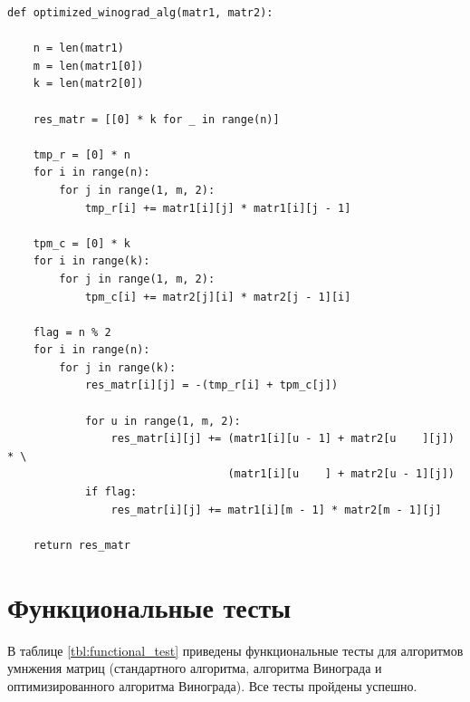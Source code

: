 \documentclass[a4paper,14pt, unknownkeysallowed]{extreport}
\begin{document}
\begin{center}
\captionsetup{justification=raggedright,singlelinecheck=off}
\begin{lstlisting}[label=lst:optimized_winograd_alg,caption=Функция умножения матриц оптимизированным алгоритмом Винограда]
def optimized_winograd_alg(matr1, matr2):

    n = len(matr1)
    m = len(matr1[0])
    k = len(matr2[0])

    res_matr = [[0] * k for _ in range(n)]

    tmp_r = [0] * n
    for i in range(n):
        for j in range(1, m, 2):
            tmp_r[i] += matr1[i][j] * matr1[i][j - 1]

    tpm_c = [0] * k
    for i in range(k):
        for j in range(1, m, 2):
            tpm_c[i] += matr2[j][i] * matr2[j - 1][i]

    flag = n % 2
    for i in range(n):
        for j in range(k):
            res_matr[i][j] = -(tmp_r[i] + tpm_c[j])

            for u in range(1, m, 2):
                res_matr[i][j] += (matr1[i][u - 1] + matr2[u    ][j]) * \
                                  (matr1[i][u    ] + matr2[u - 1][j])
            if flag:
                res_matr[i][j] += matr1[i][m - 1] * matr2[m - 1][j]

    return res_matr
\end{lstlisting}
\end{center}

\clearpage

\section{Функциональные тесты}

В таблице \ref{tbl:functional_test} приведены функциональные тесты для алгоритмов умнжения матриц (стандартного алгоритма, алгоритма Винограда и оптимизированного алгоритма Винограда). Все тесты пройдены успешно.
\end{document}
